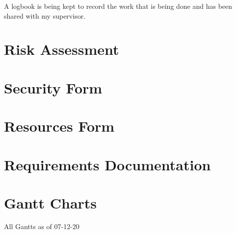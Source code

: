 \documentclass[twoside,twocolumn]{article}
\begin{document}
A logbook is being kept to record the work that is being done and has been shared with my supervisor. 






\newpage


\appendix

\section{Risk Assessment}
\label{appendix:risk}



\section{Security Form}
\label{appendix:security}



\section{Resources Form}
\label{appendix:resources}


\section{Requirements Documentation}
\label{appendix:requirements}


\section{Gantt Charts}
\label{appendix:charts}
All Gantts as of 07-12-20





\end{document}
